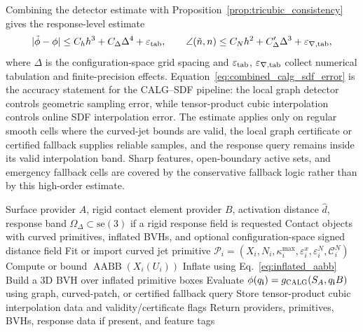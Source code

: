 \documentclass[preprint,12pt]{elsarticle}
\newcommand{\Cc}{\mathcal{C}}
\newcommand{\Pc}{\mathcal{P}}
\newcommand{\eps}{\varepsilon}
\newcommand{\calg}{\textsc{CALG}}
\begin{document}
Combining the detector estimate with Proposition~\ref{prop:tricubic_consistency} gives the response-level estimate
\begin{equation}
    |\tilde\phi-\phi|\le C_h h^3+C_\Delta\Delta^4+\eps_{\rm tab},
    \qquad
    \angle(\tilde n,n)\le C_N h^2+C'_\Delta\Delta^3+\eps_{\nabla,\rm tab},
    \label{eq:combined_calg_sdf_error}
\end{equation}
where $\Delta$ is the configuration-space grid spacing and $\eps_{\rm tab}$, $\eps_{\nabla,\rm tab}$ collect numerical tabulation and finite-precision effects. Equation~\eqref{eq:combined_calg_sdf_error} is the accuracy statement for the \calg{}--SDF pipeline: the local graph detector controls geometric sampling error, while tensor-product cubic interpolation controls online SDF interpolation error. The estimate applies only on regular smooth cells where the curved-jet bounds are valid, the local graph certificate or certified fallback supplies reliable samples, and the response query remains inside its valid interpolation band. Sharp features, open-boundary active sets, and emergency fallback cells are covered by the conservative fallback logic rather than by this high-order estimate.

\begin{algorithm}[t]
\caption{Preprocessing for \calg{}--SDF}
\label{alg:preprocess}
\begin{algorithmic}[1]
\Require Surface provider $A$, rigid contact element provider $B$, activation distance $\hat d$, response band $\Omega_\Delta\subset \mathrm{se}(3)$ if a rigid response field is requested
\Ensure Contact objects with curved primitives, inflated BVHs, and optional configuration-space signed distance field
    \State Fit or import curved jet primitive $\Pc_i=(X_i,N_i,\kappa_i^{\max},\eps_i^x,\eps_i^N,\Cc_i^N)$
    \State Compute or bound $\operatorname{AABB}(X_i(U_i))$
    \State Inflate using Eq.~\eqref{eq:inflated_aabb}
\EndFor
\State Build a 3D BVH over inflated primitive boxes
        \State Evaluate $\phi(q_{\mathbf i})=g_{\calg}(S_A,q_{\mathbf i}B)$ using graph, curved-patch, or certified fallback query
    \EndFor
    \State Store tensor-product cubic interpolation data and validity/certificate flags
\EndIf
\State Return providers, primitives, BVHs, response data if present, and feature tags
\end{algorithmic}
\end{algorithm}
\end{document}
